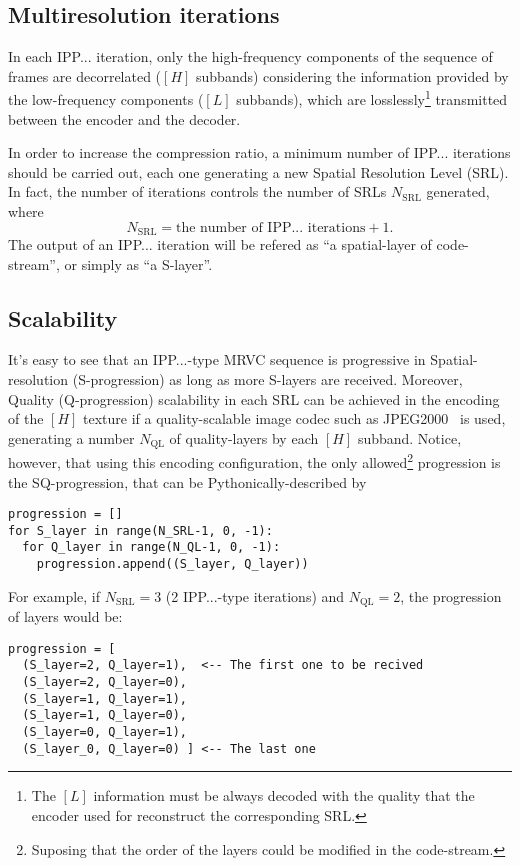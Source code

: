 \subsection{Multiresolution iterations}
In each IPP... iteration, only the high-frequency components of the
sequence of frames are decorrelated ($[H]$ subbands) considering the
information provided by the low-frequency components ($[L]$ subbands),
which are losslessly\footnote{The $[L]$ information must be always
decoded with the quality that the encoder used for reconstruct the
corresponding SRL.} transmitted between the encoder and the decoder.

In order to increase the compression ratio, a minimum number of
IPP... iterations should be carried out, each one generating a new
Spatial Resolution Level (SRL). In fact, the number of iterations
controls the number of SRLs $N_{\text{SRL}}$ generated, where
\begin{equation}
  N_{\text{SRL}} = \text{the number of IPP... iterations} + 1.
\end{equation}
The output of an IPP... iteration will be refered as ``a
spatial-layer of code-stream'', or simply as ``a S-layer''.

\subsection{Scalability}
It's easy to see that an IPP...-type MRVC sequence is progressive in
Spatial-resolution (S-progression) as long as more S-layers are
received. Moreover, Quality (Q-progression) scalability in each SRL
can be achieved in the encoding of the $[H]$ texture if a
quality-scalable image codec such as
JPEG2000~\cite{taubman2002jpeg2000} is used, generating a number
$N_{\text{QL}}$ of quality-layers by each $[H]$ subband. Notice,
however, that using this encoding configuration, the only
allowed\footnote{Suposing that the order of the layers could be
modified in the code-stream.} progression is the SQ-progression, that
can be Pythonically-described by
\begin{verbatim}
progression = []
for S_layer in range(N_SRL-1, 0, -1):
  for Q_layer in range(N_QL-1, 0, -1):
    progression.append((S_layer, Q_layer))
\end{verbatim}

For example, if $N_{\text{SRL}}=3$ (2 IPP...-type iterations) and
$N_{\text{QL}}=2$, the progression of layers would be:
\begin{verbatim}
progression = [
  (S_layer=2, Q_layer=1),  <-- The first one to be recived
  (S_layer=2, Q_layer=0),
  (S_layer=1, Q_layer=1),
  (S_layer=1, Q_layer=0),
  (S_layer=0, Q_layer=1),
  (S_layer_0, Q_layer=0) ] <-- The last one
\end{verbatim}

